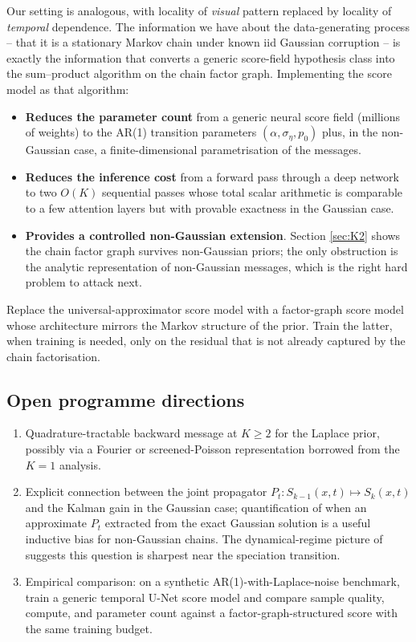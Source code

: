 \documentclass[11pt]{article}
\theoremstyle{definition}
\begin{document}
Our setting is analogous, with locality of \emph{visual} pattern
replaced by locality of \emph{temporal} dependence. The information we
have about the data-generating process -- that it is a stationary
Markov chain under known iid Gaussian corruption -- is exactly the
information that converts a generic score-field hypothesis class into
the sum--product algorithm on the chain factor graph. Implementing
the score model as that algorithm:

\begin{itemize}[leftmargin=1.4em, itemsep=2pt]
\item \textbf{Reduces the parameter count} from a generic neural
score field (millions of weights) to the AR(1) transition parameters
\((\alpha, \sigma_\eta, p_0)\) plus, in the non-Gaussian case, a
finite-dimensional parametrisation of the messages.
\item \textbf{Reduces the inference cost} from a forward pass through
a deep network to two \(O(K)\) sequential passes whose total scalar
arithmetic is comparable to a few attention layers but with provable
exactness in the Gaussian case.
\item \textbf{Provides a controlled non-Gaussian extension}. Section
\ref{sec:K2} shows the chain factor graph survives non-Gaussian
priors; the only obstruction is the analytic representation of
non-Gaussian messages, which is the right hard problem to attack
next.
\end{itemize}

\begin{intuition}
Replace the universal-approximator score model with a
factor-graph score model whose architecture mirrors the Markov
structure of the prior. Train the latter, when training is needed,
only on the residual that is not already captured by the chain
factorisation.
\end{intuition}

\subsection{Open programme directions}

\begin{enumerate}[leftmargin=1.4em]
\item Quadrature-tractable backward message at \(K \geq 2\) for the
Laplace prior, possibly via a Fourier or screened-Poisson
representation borrowed from the \(K = 1\) analysis.
\item Explicit connection between the joint propagator
\(P_t : S_{k - 1}(x, t) \mapsto S_k(x, t)\) and the Kalman gain in
the Gaussian case; quantification of when an approximate \(P_t\)
extracted from the exact Gaussian solution is a useful inductive bias
for non-Gaussian chains. The dynamical-regime picture of
\cite{Biroli2024} suggests this question is sharpest near the
speciation transition.
\item Empirical comparison: on a synthetic AR(1)-with-Laplace-noise
benchmark, train a generic temporal U-Net score model and compare
sample quality, compute, and parameter count against a
factor-graph-structured score with the same training budget.
\end{enumerate}
\end{document}
